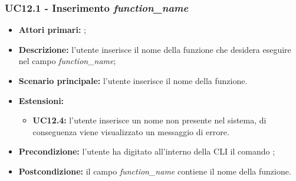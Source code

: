 \subsubsection{UC12.1 - Inserimento \textit{function\_name}}
\begin{itemize}
	\item \textbf{Attori primari:} \ua{};
	\item \textbf{Descrizione:} l’utente inserisce il nome della funzione che desidera eseguire nel campo \textit{function\_name};
	\item \textbf{Scenario principale:} l'utente inserisce il nome della funzione. 
	\item \textbf{Estensioni:} 
	\begin{itemize}
		\item \textbf{UC12.4:} l’utente inserisce un nome non presente nel sistema, di conseguenza viene visualizzato un messaggio di errore.
	\end{itemize}
	\item \textbf{Precondizione:} l’utente ha digitato all’interno della CLI il comando \run{};
	\item \textbf{Postcondizione:}  il campo \textit{function\_name} contiene il nome della funzione.
\end{itemize}